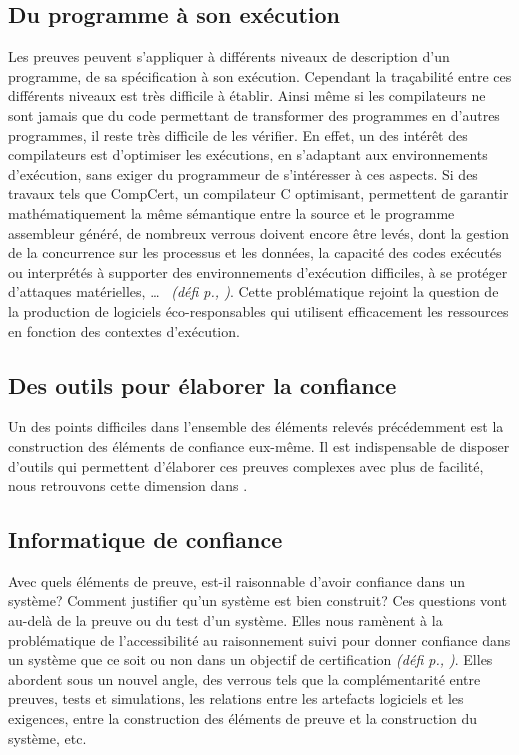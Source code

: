 \documentclass[11pt]{article}
\newcommand{\defi}[1]{\emph{(défi p.\pageref{#1}, \cite{#1})}}
\begin{document}
\subsection{Du programme à son exécution\label{ss:fiabilite:execution}}
Les preuves peuvent s'appliquer à différents niveaux de description d'un programme, de sa spécification à son exécution. Cependant la traçabilité entre ces différents niveaux est très difficile à établir. 
Ainsi même si les compilateurs ne sont jamais que du code permettant de transformer des programmes en d'autres programmes, il reste très difficile de les vérifier. En effet, un des intérêt des compilateurs est d'optimiser les exécutions, en s'adaptant aux environnements d'exécution, sans exiger du programmeur de s'intéresser à ces aspects.  Si des travaux tels que CompCert, un compilateur C optimisant, permettent de garantir mathématiquement la même sémantique entre la source et le programme assembleur généré, de nombreux verrous doivent encore être levés, dont la gestion de la concurrence sur les processus et les données, la capacité des codes exécutés ou interprétés à supporter des environnements d'exécution difficiles, à se protéger d'attaques matérielles, …
~\defi{Monniaux}.
Cette problématique rejoint la question de la production de logiciels éco-responsables qui utilisent efficacement les ressources en fonction des contextes d'exécution\cite{vert}. 

\subsection{Des outils pour élaborer la confiance}
Un des points difficiles dans l'ensemble des éléments relevés précédemment est la construction des éléments de confiance eux-même. Il est indispensable de disposer d'outils qui permettent d'élaborer ces preuves complexes avec plus de facilité, nous retrouvons cette dimension dans \cite{Monniaux, reconfiguration}.  

\subsection{Informatique de confiance}
Avec quels éléments de preuve, est-il raisonnable d'avoir confiance dans un système? Comment justifier qu'un système est bien construit? Ces questions vont au-delà de la preuve ou du test d'un système. Elles nous ramènent à  la problématique de l'accessibilité au raisonnement suivi pour donner confiance dans un système que ce soit ou non dans un objectif de certification \defi{argumentation}. 
Elles abordent sous un nouvel angle, des verrous tels que la 
complémentarité entre preuves, tests et simulations, les relations entre les artefacts logiciels et les exigences, entre la construction des éléments de preuve et la construction du système, etc. 
\end{document}
